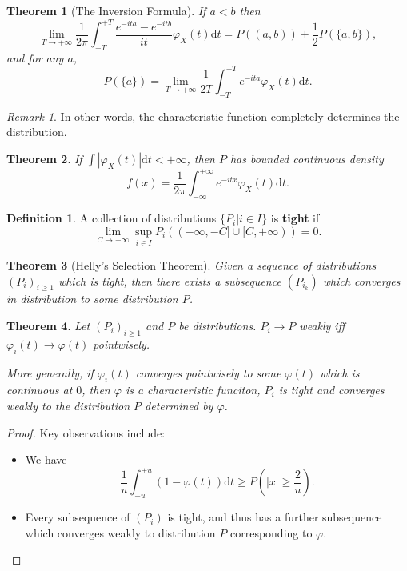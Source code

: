\documentclass[openany]{book}
\newtheorem{theorem}{Theorem}[chapter]
\theoremstyle{definition}
\newtheorem{definition}{Definition}[chapter]
\theoremstyle{remark}
\newtheorem*{remark}{Remark}
\begin{document}
\begin{theorem}[The Inversion Formula]
    If $a<b$ then
    \begin{equation*}
        \lim_{T\to+\infty}\frac{1}{2\pi}\int_{-T}^{+T}\frac{e^{-ita}-e^{-itb}}{it}\varphi_X(t)\mathrm{d}t=P\left((a,b)\right)+\frac{1}{2}P\left(\{a,b\}\right),
    \end{equation*}
    and for any $a$,
    \begin{equation*}
        P\left(\{a\}\right)=\lim_{T\to+\infty}\frac{1}{2T}\int_{-T}^{+T}e^{-ita}\varphi_X(t)\mathrm{d}t.
    \end{equation*}
\end{theorem}
\begin{remark}
    In other words, the characteristic function completely determines the distribution.
\end{remark}
\begin{theorem}
    If $\int|\varphi_X(t)|\mathrm{d}t<+\infty$, then $P$ has bounded continuous density
    \begin{equation*}
        f(x)=\frac{1}{2\pi}\int_{-\infty}^{+\infty}e^{-itx}\varphi_X(t)\mathrm{d}t.
    \end{equation*}
\end{theorem}

\begin{definition}
    A collection of distributions $\{P_i|i\in I\}$ is \textbf{tight} if
    \begin{equation*}
        \lim_{C\to+\infty}\sup_{i\in I}P_i\left((-\infty,-C]\cup[C,+\infty)\right)=0.
    \end{equation*}
\end{definition}
\begin{theorem}[Helly's Selection Theorem]
    Given a sequence of distributions $(P_i)_{i\ge1}$ which is tight, then there exists a subsequence $(P_{i_k})$ which converges in distribution to some distribution $P$.
\end{theorem}
\begin{theorem}
    Let $(P_i)_{i\ge1}$ and $P$ be distributions. $P_i\to P$ weakly iff $\varphi_i(t)\to\varphi(t)$ pointwisely.

    More generally, if $\varphi_i(t)$ converges pointwisely to some $\varphi(t)$ which is continuous at $0$, then $\varphi$ is a characteristic funciton, $P_i$ is tight and converges weakly to the distribution $P$ determined by $\varphi$.
\end{theorem}
\begin{proof}
    Key observations include:
    \begin{itemize}
        \item We have
        \begin{equation*}
            \frac{1}{u}\int_{-u}^{+u}\left(1-\varphi(t)\right)\mathrm{d}t\ge P\left(|x|\ge \frac{2}{u}\right).
        \end{equation*}

        \item Every subsequence of $(P_i)$ is tight, and thus has a further subsequence which converges weakly to distribution $P$ corresponding to $\varphi$.
    \end{itemize}
\end{proof}
\end{document}
